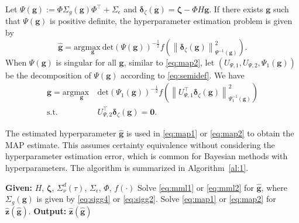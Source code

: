 \documentclass{ifacconf}
\newcommand{\norm}[1]{\left\lVert#1\right\rVert}
\newcommand{\dett}[1]{\mathrm{det}\left(#1\right)}
\begin{document}
Let $\Psi(\mathbf{g}):=\Phi\Sigma_g(\mathbf{g})\Phi^\top+\Sigma_\epsilon$ and $\boldsymbol{\delta}_\zeta(\mathbf{g})=\boldsymbol{\zeta}-\Phi H\mathbf{g}$. If there exists $\mathbf{g}$ such that $\Psi(\mathbf{g})$ is positive definite, the hyperparameter estimation problem is given by
\begin{equation}
    \hat{\mathbf{g}}=\mathrm{arg}\underset{\mathbf{g}}{\mathrm{max}}\ \dett{\Psi(\mathbf{g})}^{-\frac{1}{2}}f\left(\norm{\boldsymbol{\delta}_\zeta(\mathbf{g})}_{\Psi^{-1}(\mathbf{g})}^2\right).
    \label{eq:mml1}
\end{equation}
When $\Psi(\mathbf{g})$ is singular for all $\mathbf{g}$, similar to \eqref{eq:map2}, let $\left(U_{\Psi,1},U_{\Psi,2},\Psi_1(\mathbf{g})\right)$ be the decomposition of $\Psi(\mathbf{g})$ according to \eqref{eq:semidef}. We have
\begin{equation}
\begin{aligned}
    \hat{\mathbf{g}}=\mathrm{arg}\underset{\mathbf{g}}{\mathrm{max}}&\ \dett{\Psi_1(\mathbf{g})}^{-\frac{1}{2}}f\left(\norm{U_{\Psi,1}^\top\boldsymbol{\delta}_\zeta(\mathbf{g})}_{\Psi_1^{-1}(\mathbf{g})}^2\right)\\
    \mathrm{s.t.}&\ U_{\Psi,2}^\top\boldsymbol{\delta}_\zeta(\mathbf{g})=\mathbf{0}.
\end{aligned}
\label{eq:mml2}
\end{equation}

The estimated hyperparameter $\hat{\mathbf{g}}$ is used in \eqref{eq:map1} or \eqref{eq:map2} to obtain the MAP estimate. This assumes certainty equivalence without considering the hyperparameter estimation error, which is common for Bayesian methods with hyperparameters.
The algorithm is summarized in Algorithm~\ref{al:1}.
\begin{algorithm}[htb]
\caption{MAP estimator for data-driven smoothing, prediction, and control}
    \begin{algorithmic}[1]
        \State \textbf{Given:} $H$, $\boldsymbol{\zeta}$, $\Sigma_\nu^d(\tau)$, $\Sigma_\epsilon$, $\Phi$, $f(\cdot)$
        \State Solve \eqref{eq:mml1} or \eqref{eq:mml2} for $\hat{\mathbf{g}}$, where $\Sigma_g(\mathbf{g})$ is given by \eqref{eq:sigg4} or \eqref{eq:sigg2}.
        \State Solve \eqref{eq:map1} or \eqref{eq:map2} for $\hat{\mathbf{z}}(\hat{\mathbf{g}})$.
        \State \textbf{Output:} $\hat{\mathbf{z}}(\hat{\mathbf{g}})$
    \end{algorithmic}
\label{al:1}
\end{algorithm}
\end{document}
